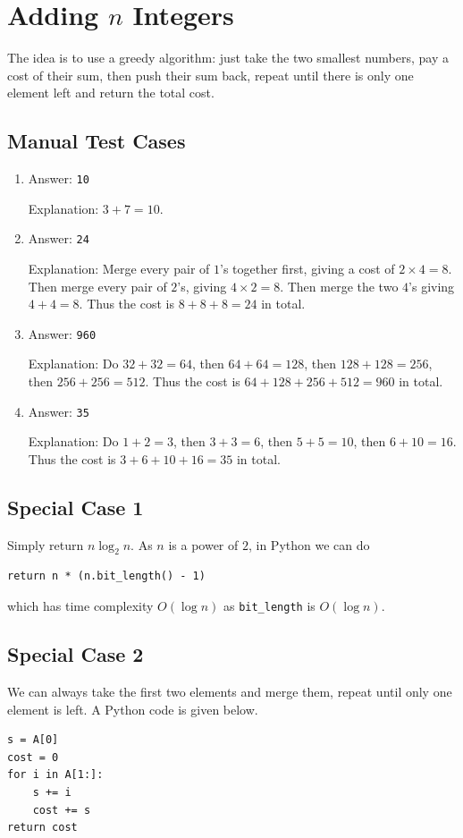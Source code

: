 \documentclass[12pt]{article}
\renewcommand{\t}{\texttt}
\begin{document}
\section{Adding $n$ Integers}
The idea is to use a greedy algorithm: just take the two smallest numbers, pay a cost of their sum, then push their sum back, repeat until there is only one element left and return the total cost.
\subsection{Manual Test Cases}
\begin{enumerate}[label=\roman*.]
\item Answer: \t{10}

Explanation: $3+7=10$.
\item Answer: \t{24}

Explanation: Merge every pair of $1$'s together first, giving a cost of $2\times4=8$. Then merge every pair of $2$'s, giving $4\times 2=8$. Then merge the two $4$'s giving $4+4=8$. Thus the cost is $8+8+8=24$ in total.
\item Answer: \t{960}

Explanation: Do $32+32=64$, then $64+64=128$, then $128+128=256$, then $256+256=512$. Thus the cost is $64+128+256+512=960$ in total.
\item Answer: \t{35}

Explanation: Do $1+2=3$, then $3+3=6$, then $5+5=10$, then $6+10=16$. Thus the cost is $3+6+10+16=35$ in total.
\end{enumerate}
\subsection{Special Case 1}
Simply return $n\log_2{n}$. As $n$ is a power of $2$, in Python we can do
\begin{verbatim}
return n * (n.bit_length() - 1)
\end{verbatim}
which has time complexity $O(\log n)$ as \t{bit\_length} is $O(\log n)$.
\subsection{Special Case 2}
We can always take the first two elements and merge them, repeat until only one element is left. A Python code is given below.
\begin{verbatim}
s = A[0]
cost = 0
for i in A[1:]:
    s += i
    cost += s
return cost
\end{verbatim}
\end{document}
